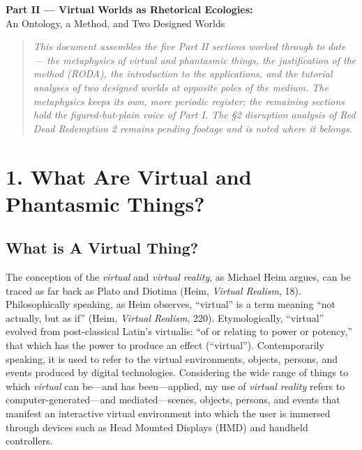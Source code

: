 \documentclass{article}
\begin{document}
\begin{center}
{\LARGE\bfseries Part II — Virtual Worlds as Rhetorical Ecologies:}\\[4pt]
{\large An Ontology, a Method, and Two Designed Worlds}
\end{center}
\vspace{1em}


\begin{quote}\small\itshape This document assembles the five Part II sections worked through to date — the metaphysics of virtual and phantasmic things, the justification of the method (RODA), the introduction to the applications, and the tutorial analyses of two designed worlds at opposite poles of the medium. The metaphysics keeps its own, more periodic register; the remaining sections hold the figured-but-plain voice of Part I. The §2 disruption analysis of Red Dead Redemption 2 remains pending footage and is noted where it belongs.\end{quote}

\bigskip

\bigskip

\section*{1. What Are Virtual and Phantasmic Things?}

\subsection*{What is A Virtual Thing?}

The conception of the \textit{virtual} and \textit{virtual reality}, as Michael Heim argues, can be traced as far back as Plato and Diotima (Heim, \textit{Virtual Realism}, 18). Philosophically speaking, as Heim observes, ``virtual'' is a term meaning ``not actually, but as if'' (Heim, \textit{Virtual Realism}, 220). Etymologically, ``virtual'' evolved from post-classical Latin’s virtualis: ``of or relating to power or potency,'' that which has the power to produce an effect (``virtual''). Contemporarily speaking, it is used to refer to the virtual environments, objects, persons, and events produced by digital technologies. Considering the wide range of things to which \textit{virtual} can be—and has been—applied, my use of \textit{virtual reality} refers to computer-generated—and mediated—scenes, objects, persons, and events that manifest an interactive virtual environment into which the user is immersed through devices such as Head Mounted Displays (HMD) and handheld controllers.
\end{document}
